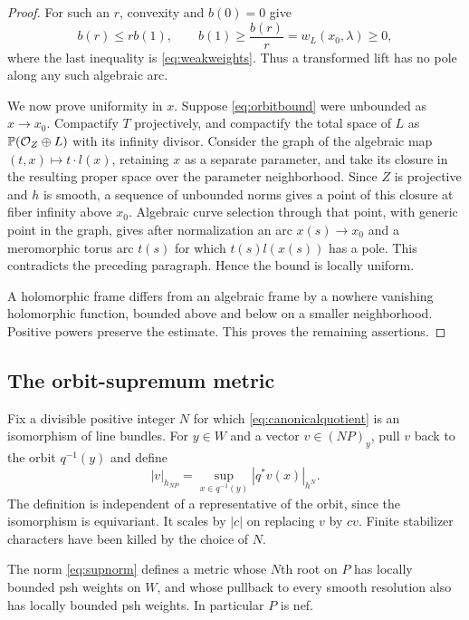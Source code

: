 \begin{proof}
For such an $r$, convexity and $b(0)=0$ give
\[
b(r)\le r b(1),\qquad
b(1)\ge\frac{b(r)}r=w_L(x_0,\lambda)\ge0,
\]
where the last inequality is \eqref{eq:weakweights}. Thus a transformed lift has no pole along any such algebraic arc.

We now prove uniformity in $x$. Suppose \eqref{eq:orbitbound} were unbounded as $x\to x_0$. Compactify $T$ projectively, and compactify the total space of $L$ as $\mathbb P(\mathcal O_Z\oplus L)$ with its infinity divisor. Consider the graph of the algebraic map $(t,x)\mapsto t\cdot l(x)$, retaining $x$ as a separate parameter, and take its closure in the resulting proper space over the parameter neighborhood. Since $Z$ is projective and $h$ is smooth, a sequence of unbounded norms gives a point of this closure at fiber infinity above $x_0$. Algebraic curve selection through that point, with generic point in the graph, gives after normalization an arc $x(s)\to x_0$ and a meromorphic torus arc $t(s)$ for which $t(s)l(x(s))$ has a pole. This contradicts the preceding paragraph. Hence the bound is locally uniform.

A holomorphic frame differs from an algebraic frame by a nowhere vanishing holomorphic function, bounded above and below on a smaller neighborhood. Positive powers preserve the estimate. This proves the remaining assertions.
\end{proof}

\subsection{The orbit-supremum metric}\label{subsec:minimum}

Fix a divisible positive integer $N$ for which \eqref{eq:canonicalquotient} is an isomorphism of line bundles. For $y\in W$ and a vector $v\in (NP)_y$, pull $v$ back to the orbit $q^{-1}(y)$ and define
\begin{equation}\label{eq:supnorm}
|v|_{h_{NP}}=\sup_{x\in q^{-1}(y)}|q^*v(x)|_{h^N}.
\end{equation}
The definition is independent of a representative of the orbit, since the isomorphism is equivariant. It scales by $|c|$ on replacing $v$ by $cv$. Finite stabilizer characters have been killed by the choice of $N$.

\begin{proposition}\label{prop:quotientmetric}
The norm \eqref{eq:supnorm} defines a metric whose $N$th root on $P$ has locally bounded psh weights on $W$, and whose pullback to every smooth resolution also has locally bounded psh weights. In particular $P$ is nef.
\end{proposition}

